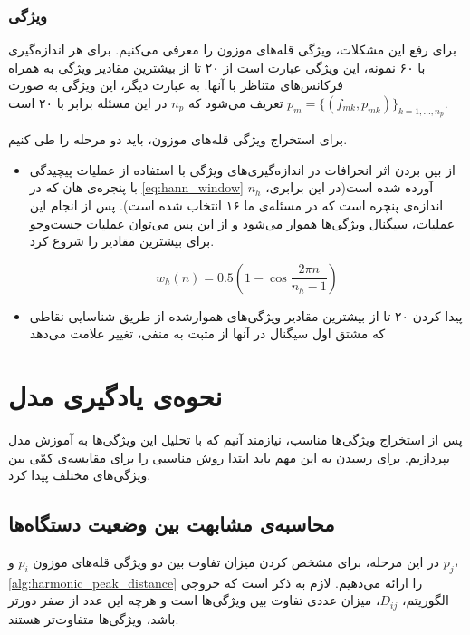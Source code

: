 \subsubsection{ویژگی }

برای رفع این مشکلات، ویژگی قله‌های موزون را معرفی می‌کنیم. برای هر اندازه‌گیری با ۶۰ نمونه، این ویژگی عبارت است از ۲۰ تا از بیشترین مقادیر ویژگی  به همراه فرکانس‌های متناظر با آنها. به عبارت دیگر، این ویژگی به صورت $p_m = \{(f_{mk}, p_{mk})\}_{k=1, ..., n_p}$ تعریف می‌شود که $n_p$ در این مسئله برابر با ۲۰ است.

برای استخراج ویژگی قله‌های موزون، باید دو مرحله را طی کنیم.
\begin{itemize}
\item از بین بردن اثر انحرافات در اندازه‌گیری‌های ویژگی‌  با استفاده از عملیات پیچیدگی با پنجره‌ی هان که در \cref{eq:hann_window} آورده شده است(در این برابری، $n_h$ اندازه‌ی پنچره است که در مسئله‌ی ما ۱۶ انتخاب شده است). پس از انجام این عملیات، سیگنال ویژگی‌ها هموار می‌شود و از این پس می‌توان عملیات جست‌وجو برای بیشترین مقادیر را شروع کرد.

\begin{equation}
\label{eq:hann_window}
w_h(n) = 0.5 (1 - \cos{\dfrac{2\pi n}{n_h - 1}})
\end{equation}

\item پیدا کردن ۲۰ تا از بیشترین مقادیر ویژگی‌های هموارشده از طریق شناسایی نقاطی که مشتق اول سیگنال در آنها از مثبت به منفی، تغییر علامت می‌دهد

\end{itemize}

\section{نحوه‌ی یادگیری مدل}
پس از استخراج ویژگی‌ها مناسب، نیازمند آنیم که با تحلیل این ویژگی‌ها به آموزش مدل بپردازیم. برای رسیدن به این مهم باید ابتدا روش مناسبی را برای مقایسه‌ی کمّی بین ویژگی‌های مختلف پیدا کرد. 

\subsection{محاسبه‌ی مشابهت بین وضعیت دستگاه‌ها}
در این مرحله، برای مشخص کردن میزان تفاوت بین دو ویژگی قله‌های موزون $p_i$ و $p_j$، \cref{alg:harmonic_peak_distance} را ارائه می‌دهیم. لازم به ذکر است که خروجی الگوریتم، $D_{ij}$، میزان عددی تفاوت بین ویژگی‌ها است و هرچه این عدد از صفر دورتر باشد، ویژگی‌ها متفاوت‌تر هستند\cite{jung2017vibration}.

